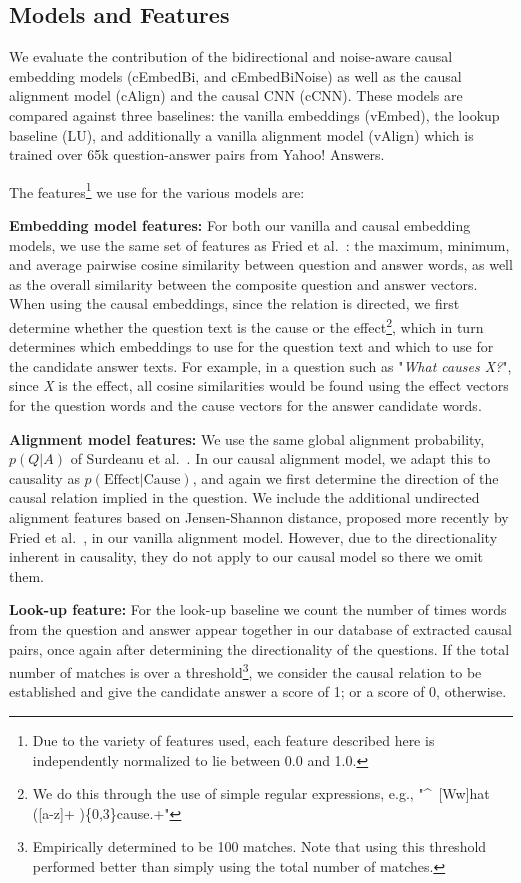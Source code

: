 \subsection{Models and Features}

We evaluate the contribution of the bidirectional and noise-aware causal embedding models (cEmbedBi, and cEmbedBiNoise) as well as the causal alignment model (cAlign) and the causal CNN (cCNN).  These models are compared against three baselines: the vanilla embeddings (vEmbed), the lookup baseline (LU), and additionally a vanilla alignment model (vAlign) which is trained over 65k question-answer pairs from Yahoo! Answers.

The features\footnote{Due to the variety of features used, each feature described here is independently normalized to lie between 0.0 and 1.0.} we use for the various models are:

{ \flushleft \textbf{Embedding model features:}}
For both our vanilla and causal embedding models, we use the same set of features as 
Fried et al.~: the maximum, minimum, and average pairwise cosine similarity between question and answer words, as well as the overall similarity between the composite question and answer vectors.  
When using the causal embeddings, since the relation is directed, we first determine whether the question text is the cause or the effect\footnote{We do this through the use of simple regular expressions, e.g., "\^~[Ww]hat ([a-z]+ )\{0,3\}cause.+"}, which in turn determines which embeddings to use for the question text and which to use for the candidate answer texts.  For example, in a question such as "\emph{What causes X?}", since \emph{X} is the effect, all cosine similarities would be found using the effect vectors for the question words and the cause vectors for the answer candidate words. 

{\flushleft \textbf{Alignment model features:}} We use the same global alignment probability, $p(Q|A)$ of Surdeanu et al.~. In our causal alignment model, we adapt this to causality as $p(\text{Effect}|\text{Cause})$, and again we first determine the direction of the causal relation implied in the question.  We include the additional undirected alignment features based on Jensen-Shannon distance, proposed more recently by Fried et al.~, in our vanilla alignment model.  However, due to the directionality inherent in causality, they do not apply to our causal model so there we omit them.

{\flushleft \textbf{Look-up feature:}} For the look-up baseline we count the number of times words from the question and answer appear together in our database of extracted causal pairs, once again after determining the directionality of the questions.  If the total number of matches is over a threshold\footnote{Empirically determined to be 100 matches.  Note that using this threshold performed better than simply using the total number of matches.}, we consider the causal relation to be established and give the candidate answer a score of 1; or a score of 0, otherwise.

